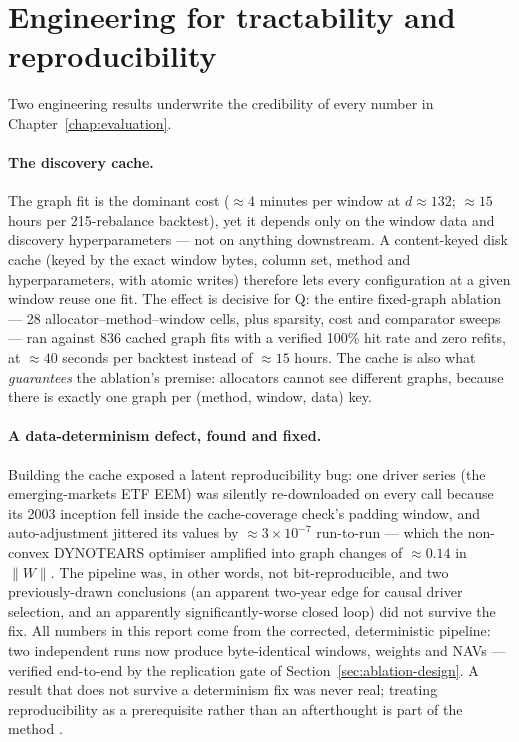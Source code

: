 \section{Engineering for tractability and reproducibility}
\label{sec:cache}

Two engineering results underwrite the credibility of every number in
Chapter~\ref{chap:evaluation}.

\paragraph{The discovery cache.} The graph fit is the dominant cost
(${\approx}4$ minutes per window at $d\approx132$; ${\approx}15$ hours per
215-rebalance backtest), yet it depends only on the window data and discovery
hyperparameters --- not on anything downstream. A content-keyed disk cache
(keyed by the exact window bytes, column set, method and hyperparameters,
with atomic writes) therefore lets every configuration at a given window
reuse one fit. The effect is decisive for Q: the entire fixed-graph ablation
--- 28 allocator--method--window cells, plus sparsity, cost and comparator
sweeps --- ran against 836 cached graph fits with a verified 100\% hit rate
and zero refits, at ${\approx}40$ seconds per backtest instead of
${\approx}15$ hours. The cache is also what \emph{guarantees} the ablation's
premise: allocators cannot see different graphs, because there is exactly one
graph per (method, window, data) key.

\paragraph{A data-determinism defect, found and fixed.} Building the cache
exposed a latent reproducibility bug: one driver series (the
emerging-markets ETF EEM) was silently re-downloaded on every call because
its 2003 inception fell inside the cache-coverage check's padding window,
and auto-adjustment jittered its values by ${\approx}3\times10^{-7}$
run-to-run --- which the non-convex DYNOTEARS optimiser amplified into graph
changes of ${\approx}0.14$ in $\lVert W\rVert$. The pipeline was, in other
words, not bit-reproducible, and two previously-drawn conclusions (an
apparent two-year edge for causal driver selection, and an apparently
significantly-worse closed loop) did not survive the fix. All numbers in
this report come from the corrected, deterministic pipeline: two independent
runs now produce byte-identical windows, weights and NAVs --- verified
end-to-end by the replication gate of Section~\ref{sec:ablation-design}. A
result that does not survive a determinism fix was never real; treating
reproducibility as a prerequisite rather than an afterthought is part of the
method \cite{lopezdeprado2023causal}.
